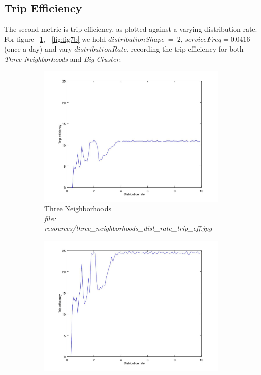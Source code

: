 \documentclass{article}
\begin{document}
		\subsection{Trip Efficiency} \label{tripef}
		The second metric is trip efficiency, as plotted against a varying distribution rate. For figure ~\ref{fig:fig7a}, ~\ref{fig:fig7b} we hold
		 $distributionShape\ =\ 2$, $serviceFreq = 0.0416$ (once a day) and vary $distributionRate$, recording
		the trip efficiency for both \textit{Three Neighborhoods} and \textit{Big Cluster}.
		

		\begin{figure}[H]
			\centering
			\begin{subfigure}[b]{.5\textwidth}
				\includegraphics[width=\textwidth]{resources/three_neighborhoods_dist_rate_trip_eff.jpg}
				\caption{Three Neighborhoods \\\textit{file: resources/three\_neighborhoods\_dist\_rate\_trip\_eff.jpg}}
				\label{fig:fig7a}
			\end{subfigure}\hfill%
			\begin{subfigure}[b]{.5\textwidth}
				\includegraphics[width=\textwidth]{resources/big_cluster_dist_rate_trip_eff.jpg}

\end{subfigure}
\end{figure}
\end{document}
